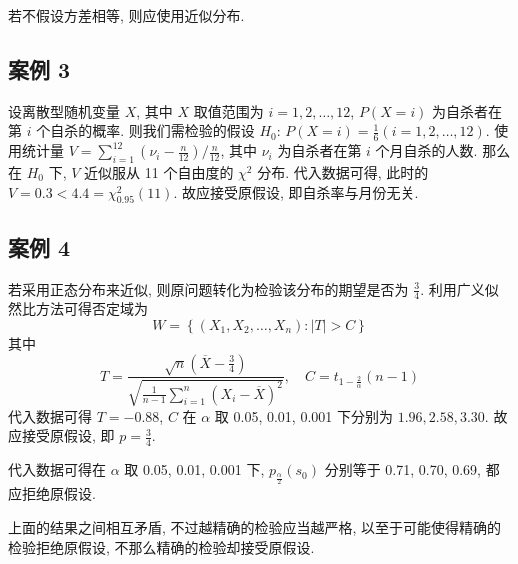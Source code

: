 \documentclass[../main.tex]{subfiles}
\begin{document}
若不假设方差相等, 则应使用近似分布.

\subsection{案例 3}
设离散型随机变量 $X$, 其中 $X$ 取值范围为 $i = 1, 2, \dots, 12$, $P \left( X = i \right)$ 为自杀者在第 $i$ 个自杀的概率.
则我们需检验的假设 $H_0$: $P \left( X = i \right) = \frac{1}{6} \left( i = 1, 2, \dots, 12 \right)$.
使用统计量 $V = \sum_{i = 1}^{12} \left( \nu_i - \frac{n}{12} \right) / \frac{n}{12}$, 其中 $\nu_i$ 为自杀者在第 $i$ 个月自杀的人数.
那么在 $H_0$ 下, $V$ 近似服从 11 个自由度的 $\chi^2$ 分布.
代入数据可得, 此时的 $V = 0.3 < 4.4 = \chi_{0.95}^2 \left( 11 \right)$.
故应接受原假设, 即自杀率与月份无关.

\subsection{案例 4}
若采用正态分布来近似, 则原问题转化为检验该分布的期望是否为 $\frac{3}{4}$.
利用广义似然比方法可得否定域为
\[
    W = \left\{ (X_1, X_2, \dots, X_n) : \left| T \right| > C \right\}
\]
其中
\[
    T = \frac{\sqrt{n} \left( \overline{X} - \frac{3}{4} \right)}{\sqrt{\frac{1}{n - 1} \sum_{i = 1}^{n} \left( X_i - \overline{X} \right)^2}}
    , \quad
    C = t_{1 - \frac{2}{\alpha}} \left( n - 1 \right)
\]
代入数据可得 $T = - 0.88$, $C$ 在 $\alpha$ 取 0.05, 0.01, 0.001 下分别为 $1.96, 2.58, 3.30$.
故应接受原假设, 即 $p = \frac{3}{4}$.

代入数据可得在 $\alpha$ 取 0.05, 0.01, 0.001 下,
$p_{\frac{\alpha}{2}} \left( s_0 \right)$ 分别等于 0.71, 0.70, 0.69, 都应拒绝原假设.

上面的结果之间相互矛盾, 不过越精确的检验应当越严格, 以至于可能使得精确的检验拒绝原假设, 不那么精确的检验却接受原假设.
\end{document}
